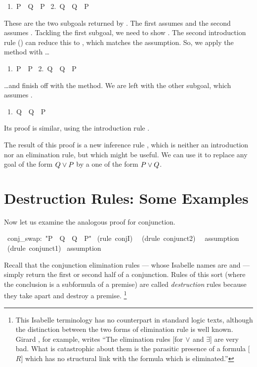 \begin{isabelle}
\ 1.\ P\ \isasymLongrightarrow\ Q\ \isasymor\ P\isanewline
\ 2.\ Q\ \isasymLongrightarrow\ Q\ \isasymor\ P
\end{isabelle}
These are the two subgoals returned by .  The first assumes
 and the  second assumes .  Tackling the first subgoal, we
need to  show \@.  The second introduction rule
() can reduce this  to , which matches the assumption.
So, we apply the
  method with  \ldots
\begin{isabelle}
\ 1.\ P\ \isasymLongrightarrow\ P\isanewline
\ 2.\ Q\ \isasymLongrightarrow\ Q\ \isasymor\ P
\end{isabelle}
\ldots and finish off with the  
method.  We are left with the other subgoal, which 
assumes .  
\begin{isabelle}
\ 1.\ Q\ \isasymLongrightarrow\ Q\ \isasymor\ P
\end{isabelle}
Its proof is similar, using the introduction 
rule . 

The result of this proof is a new inference rule , which is neither 
an introduction nor an elimination rule, but which might 
be useful.  We can use it to replace any goal of the form $Q\vee P$
by a one of the form $P\vee Q$.%


\section{Destruction Rules: Some Examples}

%
Now let us examine the analogous proof for conjunction. 
\begin{isabelle}
\ conj_swap:\ "P\ \isasymand\ Q\ \isasymLongrightarrow\ Q\ \isasymand\ P"\isanewline
{}\ (rule\ conjI)\isanewline
\ \ (drule\ conjunct2)\isanewline
\ \ assumption\isanewline
{}\ (drule\ conjunct1)\isanewline
{}\ assumption
\end{isabelle}
Recall that the conjunction elimination rules --- whose Isabelle names are 
 and  --- simply return the first or second half
of a conjunction.  Rules of this sort (where the conclusion is a subformula of a
premise) are called \emph{destruction} rules because they take apart and destroy
a premise.%
\footnote{This Isabelle terminology has no counterpart in standard logic texts, 
although the distinction between the two forms of elimination rule is well known. 
Girard \cite[page 74]{girard89}, for example, writes ``The elimination rules 
[for $\vee$ and $\exists$] are very
bad.  What is catastrophic about them is the parasitic presence of a formula [$R$]
which has no structural link with the formula which is eliminated.''}

